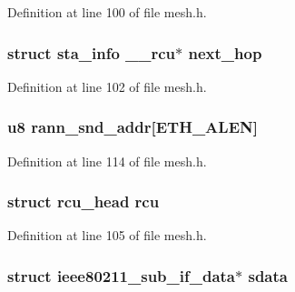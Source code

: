 Definition at line 100 of file mesh.\-h.

\hypertarget{structmesh__path_abc4b3146b43964101d2a25163375fed0}{
\subsubsection[{next\-\_\-hop}]{\setlength{\rightskip}{0pt plus 5cm}struct {\bf sta\-\_\-info} \-\_\-\-\_\-rcu$\ast$ next\-\_\-hop}}\label{structmesh__path_abc4b3146b43964101d2a25163375fed0}


Definition at line 102 of file mesh.\-h.

\hypertarget{structmesh__path_a3c1c259f27b1cdda2e17a81ff98a5310}{
\subsubsection[{rann\-\_\-snd\-\_\-addr}]{\setlength{\rightskip}{0pt plus 5cm}u8 rann\-\_\-snd\-\_\-addr\mbox{[}E\-T\-H\-\_\-\-A\-L\-E\-N\mbox{]}}}\label{structmesh__path_a3c1c259f27b1cdda2e17a81ff98a5310}


Definition at line 114 of file mesh.\-h.

\hypertarget{structmesh__path_aa9677537ffa4e40f3c4f3e9fb3b4c76d}{
\subsubsection[{rcu}]{\setlength{\rightskip}{0pt plus 5cm}struct rcu\-\_\-head rcu}}\label{structmesh__path_aa9677537ffa4e40f3c4f3e9fb3b4c76d}


Definition at line 105 of file mesh.\-h.

\hypertarget{structmesh__path_ad829d8d33f06a7245cc303f924f259ac}{
\subsubsection[{sdata}]{\setlength{\rightskip}{0pt plus 5cm}struct {\bf ieee80211\-\_\-sub\-\_\-if\-\_\-data}$\ast$ sdata}}\label{structmesh__path_ad829d8d33f06a7245cc303f924f259ac}


